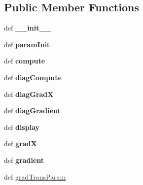 \subsection*{Public Member Functions}
\begin{CompactItemize}
\item 
\hypertarget{classkerndox_1_1kern_b85f90b813ec151926e34b96680c40b5}{
def \textbf{\_\-\_\-init\_\-\_\-}}
\label{classkerndox_1_1kern_b85f90b813ec151926e34b96680c40b5}

\item 
\hypertarget{classkerndox_1_1kern_b28caeff3b716e12403d699691bb80a3}{
def \textbf{paramInit}}
\label{classkerndox_1_1kern_b28caeff3b716e12403d699691bb80a3}

\item 
\hypertarget{classkerndox_1_1kern_11325240b76ef005012cac80cb7183f8}{
def \textbf{compute}}
\label{classkerndox_1_1kern_11325240b76ef005012cac80cb7183f8}

\item 
\hypertarget{classkerndox_1_1kern_b129a5b529c03da79fceb023ae45f992}{
def \textbf{diagCompute}}
\label{classkerndox_1_1kern_b129a5b529c03da79fceb023ae45f992}

\item 
\hypertarget{classkerndox_1_1kern_6cc2fb4ee6610debba5cfbc73334f845}{
def \textbf{diagGradX}}
\label{classkerndox_1_1kern_6cc2fb4ee6610debba5cfbc73334f845}

\item 
\hypertarget{classkerndox_1_1kern_fa43a33db4f1f00bafeb622e0043abcc}{
def \textbf{diagGradient}}
\label{classkerndox_1_1kern_fa43a33db4f1f00bafeb622e0043abcc}

\item 
\hypertarget{classkerndox_1_1kern_1eb6af1acf991ada8bad672424bdc355}{
def \textbf{display}}
\label{classkerndox_1_1kern_1eb6af1acf991ada8bad672424bdc355}

\item 
\hypertarget{classkerndox_1_1kern_9a6e5c63e91a6602b14fce8bef837658}{
def \textbf{gradX}}
\label{classkerndox_1_1kern_9a6e5c63e91a6602b14fce8bef837658}

\item 
\hypertarget{classkerndox_1_1kern_4c9e7ac8f6847a18c05f7a1b15e4ce1b}{
def \textbf{gradient}}
\label{classkerndox_1_1kern_4c9e7ac8f6847a18c05f7a1b15e4ce1b}

\item 
def \hyperlink{classkerndox_1_1kern_b35888c8c1af6431451652b44fd82002}{gradTransParam}
\end{CompactItemize}
